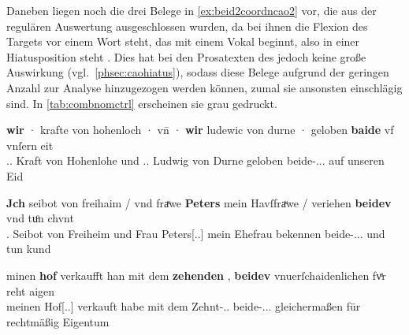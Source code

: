 Daneben liegen noch die drei Belege in \cref{ex:beid2coordncao2} vor, die aus
der regulären Auswertung ausgeschlossen wurden, da bei ihnen die Flexion des
Targets vor einem Wort steht, das mit einem Vokal beginnt, also in einer
Hiatusposition steht \autocites[vgl.][90--91]{askedal1973}[191--193,
201]{gjelsten1980}. Dies hat bei den Prosatexten des \CAO{} jedoch
keine große Auswirkung (vgl.~\cref{phsec:caohiatus}), sodass diese Belege
aufgrund der geringen Anzahl zur Analyse hinzugezogen werden können, zumal sie
ansonsten einschlägig sind. In \cref{tab:combnomctrl} erscheinen sie grau
gedruckt.

\begin{exe}
\ex \label{ex:beid2coordncao2}
	\begin{xlist}
	\ex \label{ex:beid2coordncao2_1}
		\gll \textbf{wir} · krafte von hohenloch · vn̄ · \textbf{wir} ludewic
			von durne · geloben \textbf{baide} vf vnſern eit \\
			\Fsg\subM.\Hon.\Nom{} {} Kraft von Hohenlohe {} und {}
			\Fsg\subM.\Hon.\Nom{} Ludwig von Durne {} geloben
			beide-\Nom.\Pl.\MascM.\St{} auf unseren Eid \\
		\begin{taggedline}{\parencites(Burg Hohlach, Kr.~Neustadt an der Aisch-Bad Windsheim)[\pno~2529, 563.5--6]{cao3}}
		\trans {}
		\end{taggedline}

	\ex \label{ex:beid2coordncao2_2}
		\gll \textbf{Jch} seibot von freihaim / vnd fraͮwe \textbf{Peters} mein
			Havſfraͮwe / veriehen \textbf{beidev} vnd tuͦn chvnt \\
			\Fsg\subM.\Nom{} Seibot von Freiheim {} und Frau
			Peters[\Nom.\Sg.\FemF] mein Ehefrau {} bekennen
			beide-\Nom.\Pl.\NeutMF.\St{} und tun kund \\
		\begin{taggedline}{\parencites(München, 1299)[\pno~3248, 416.23]{cao4}}
		\trans {}
		\end{taggedline}

	\ex \label{ex:beid2coordncao2_3}
		\gll minen \textbf{hof} \textelp{} verkaufft han mit dem
			\textbf{zehenden} \textelp{}, \textbf{beidev} vnuerſchaidenlichen
			fvͤr reht aigen \\
			meinen Hof[\Acc.\Sg.\MascI] {} verkauft habe mit dem
			Zehnt-\Dat.\Sg.\MascI{} {} beide-\Acc.\Pl.\NeutI.\St{}
			gleichermaßen für rechtmäßig Eigentum \\
		\begin{taggedline}{\parencites(Augsburg, 1283)[\pno~N~241, 195.37--39]{cao5}}
		\trans {}
		\end{taggedline}
	\end{xlist}
\end{exe}

